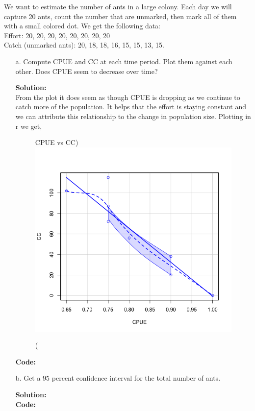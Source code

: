\documentclass[12pt]{article}
\makeatletter
\theoremstyle{homework}
\newenvironment{exercise}[1]
{\def\@currentlabel{#1}\exercisecore}
{\endexercisecore}
\newcommand{\localhead}[1]{\par\smallskip\noindent\textbf{#1}\nobreak\\}%
\newcommand\solution{\localhead{Solution:}}
\makeatother
\begin{document}
\begin{exercise}{4} We want to estimate the number of ants in a large colony. 
  Each day we will capture 20 ants, count the number that are unmarked, 
  then mark all of them with a small colored dot. 
  We get the following data:\\
  Effort: 20, 20, 20, 20, 20, 20, 20, 20\\
  Catch (unmarked ants): 20, 18, 18, 16, 15, 15, 13, 15.\\
  \begin{enumerate}
    \item[a.] Compute CPUE and CC at each time period. Plot them against each other. Does CPUE seem to decrease over time?\\
    \solution From the plot it does seem as though CPUE is dropping as we continue to catch more of the population. It helps that the 
    effort is staying constant and we can attribute this relationship to the change in population size. Plotting in r we get,  
    \begin{figure}[H]
      \begin{center}
        \caption(CPUE vs CC)
      \includegraphics[width = .9\textwidth]{Rplot.png}
      \end{center}
    \end{figure}
    \textbf{Code:}
    \begin{center}
       
    \end{center}
    \vspace{.15in}


    \item[b.] Get a 95 percent confidence interval for the total number of ants.\\
    \solution \textbf{Code:}
    \begin{center}
       
    \end{center}

  \end{enumerate}
  
\end{exercise}
\end{document}
